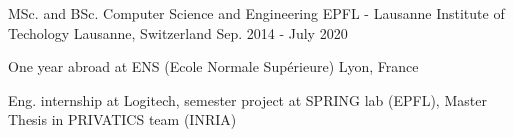 


\begin{cventries}
	
\cventry
{MSc. and BSc. Computer Science and Engineering} %
{EPFL - Lausanne Institute of Techology} %
{Lausanne, Switzerland} %
{Sep. 2014 - July 2020} %
{ %
	\begin{cvitems}
		\item {One year abroad at ENS (Ecole Normale Supérieure) Lyon, France}
		\item {Eng. internship at Logitech, semester project at SPRING lab (EPFL), Master Thesis in PRIVATICS team (INRIA)}
	\end{cvitems}
}




\end{cventries}